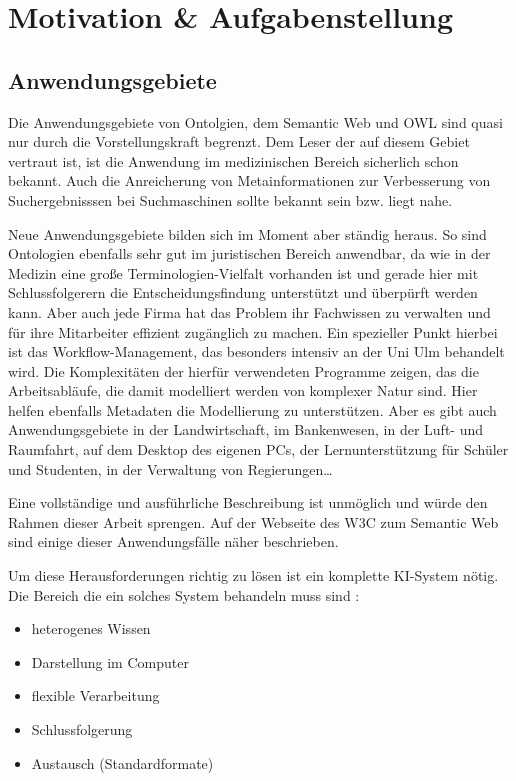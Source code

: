 \chapter{Motivation \& Aufgabenstellung}
\label{kapitel-motivation}

\section{Anwendungsgebiete}
Die Anwendungsgebiete von Ontolgien, dem Semantic Web und OWL sind quasi nur durch die Vorstellungskraft begrenzt. Dem Leser der auf diesem Gebiet vertraut ist, ist die Anwendung im medizinischen Bereich sicherlich schon bekannt. Auch die Anreicherung von Metainformationen zur Verbesserung von Suchergebnisssen bei Suchmaschinen sollte bekannt sein bzw. liegt nahe.

Neue Anwendungsgebiete bilden sich im Moment aber ständig heraus. So sind Ontologien ebenfalls sehr gut im juristischen Bereich anwendbar, da wie in der Medizin eine große Terminologien-Vielfalt vorhanden ist und gerade hier mit Schlussfolgerern die Entscheidungsfindung unterstützt und überpürft werden kann.
Aber auch jede Firma hat das Problem ihr Fachwissen zu verwalten und für ihre Mitarbeiter effizient zugänglich zu machen. Ein spezieller Punkt hierbei ist das Workflow-Management, das besonders intensiv an der Uni Ulm behandelt wird. Die Komplexitäten der hierfür verwendeten Programme zeigen, das die Arbeitsabläufe, die damit modelliert werden von komplexer Natur sind. Hier helfen ebenfalls Metadaten die Modellierung zu unterstützen.
Aber es gibt auch Anwendungsgebiete in der Landwirtschaft, im Bankenwesen, in der Luft- und Raumfahrt, auf dem Desktop des eigenen PCs, der Lernunterstützung für Schüler und Studenten, in der Verwaltung von Regierungen\ldots

Eine vollständige und ausführliche Beschreibung ist unmöglich und würde den Rahmen dieser Arbeit sprengen. Auf der Webseite des W3C zum Semantic Web \cite{W3CUseCases} sind einige dieser Anwendungsfälle näher beschrieben.

Um diese Herausforderungen richtig zu lösen ist ein komplette KI-System nötig. Die Bereich die ein solches System behandeln muss sind \cite{vonHenke2009}:

\begin{itemize}
  \item heterogenes Wissen
  \item Darstellung im Computer
  \item flexible Verarbeitung
  \item Schlussfolgerung
  \item Austausch (Standardformate)
\end{itemize}

